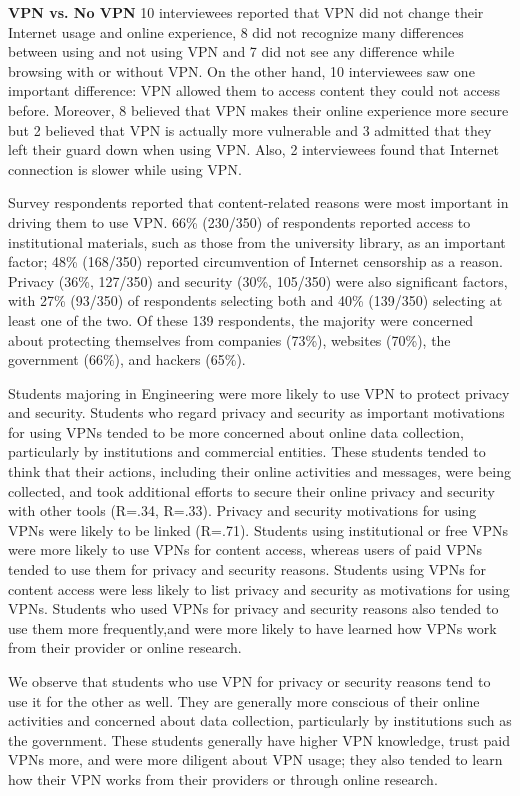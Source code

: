 \textbf{VPN vs. No VPN} 10 interviewees reported that VPN did not change their
Internet usage and online experience, 8 did not recognize many differences
between using and not using VPN and 7 did not see any difference while
browsing with or without VPN. On the other hand, 10 interviewees saw one
important difference: VPN allowed them to access content they could not access
before. Moreover, 8 believed that VPN makes their online experience more
secure but 2 believed that VPN is actually more vulnerable and 3 admitted that
they left their guard down when using VPN. Also, 2 interviewees found that
Internet connection is slower while using VPN.

Survey respondents reported that content-related reasons were most important
in driving them to use VPN. 66\% (230/350) of respondents reported access to
institutional materials, such as those from the university library, as an
important factor; 48\% (168/350) reported circumvention of Internet censorship
as a reason. Privacy (36\%, 127/350) and security (30\%, 105/350) were also
significant factors, with 27\% (93/350) of respondents selecting both and 40\%
(139/350) selecting at least one of the two. Of these 139 respondents, the
majority were concerned about protecting themselves from companies (73\%),
websites (70\%), the government (66\%), and hackers (65\%).

Students majoring in Engineering were more likely to use VPN to protect
privacy and security. Students who regard privacy and security as important
motivations for using VPNs tended to be more concerned about online data
collection, particularly by institutions and commercial entities. These
students tended to think that their actions, including their online activities
and messages, were being collected, and took additional efforts to secure
their online privacy and security with other tools (R=.34, R=.33). Privacy and
security motivations for using VPNs were likely to be linked (R=.71). Students
using institutional or free VPNs were more likely to use VPNs for content
access, whereas users of paid VPNs tended to use them for privacy and security
reasons. Students using VPNs for content access were less likely to list
privacy and security as motivations for using VPNs. Students who used VPNs for
privacy and security reasons also tended to use them more frequently,and were
more likely to have learned how VPNs work from their provider or online
research. 

We observe that students who use VPN for privacy or security reasons tend to
use it for the other as well. They are generally more conscious of their
online activities and concerned about data collection, particularly by
institutions such as the government. These students generally have higher VPN
knowledge, trust paid VPNs more, and were more diligent about VPN usage; they
also tended to learn how their VPN works from their providers or through
online research.

